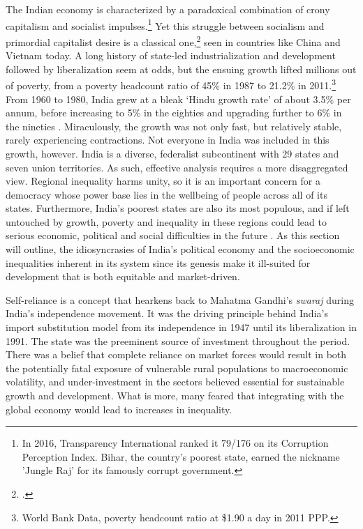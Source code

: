 \documentclass[a4paper, 11pt]{article}
\begin{document}
The Indian economy is characterized by a paradoxical combination of crony capitalism and socialist impulses.\footnote{In 2016, Transparency International ranked it 79/176 on its Corruption Perception Index.  Bihar, the country's poorest state, earned the nickname 'Jungle Raj' for its famously corrupt government.}  Yet this struggle between socialism and primordial capitalist desire is a classical one,\footnote{\citep{unnikrishnan_2017}.} seen in countries like China and Vietnam today.  A long history of state-led industrialization and development followed by liberalization seem at odds, but the ensuing growth lifted millions out of poverty, from a poverty headcount ratio of 45\% in 1987 to 21.2\% in 2011.\footnote{World Bank Data, poverty headcount ratio at \$1.90 a day in 2011 PPP.}  From 1960 to 1980, India grew at a bleak ‘Hindu growth rate’ of about 3.5\% per annum, before increasing to 5\% in the eighties and upgrading further to 6\% in the nineties \citep{kotwal_economic_2011}.  Miraculously, the growth was not only fast, but relatively stable, rarely experiencing contractions.  Not everyone in India was included in this growth, however.  India is a diverse, federalist subcontinent with 29 states and seven union territories.  As such, effective analysis requires a more disaggregated view.  Regional inequality harms unity, so it is an important concern for a democracy whose power base lies in the wellbeing of people across all of its states.  Furthermore, India's poorest states are also its most populous, and if left untouched by growth, poverty and inequality in these regions could lead to serious economic, political and social difficulties in the future \citep{purfield_mind_2006}.  As this section will outline, the idiosyncrasies of India’s political economy and the socioeconomic inequalities inherent in its system since its genesis make it ill-suited for development that is both equitable and market-driven.\par
	Self-reliance is a concept that hearkens back to Mahatma Gandhi’s \textit{swaraj} during India’s independence movement.  It was the driving principle behind India’s import substitution model from its independence in 1947 until its liberalization in 1991.  The state was the preeminent source of investment throughout the period.  There was a belief that complete reliance on market forces would result in both the potentially fatal exposure of vulnerable rural populations to macroeconomic volatility, and under-investment in the sectors believed essential for sustainable growth and development.  What is more, many feared that integrating with the global economy would lead to increases in inequality.  \par
\end{document}
